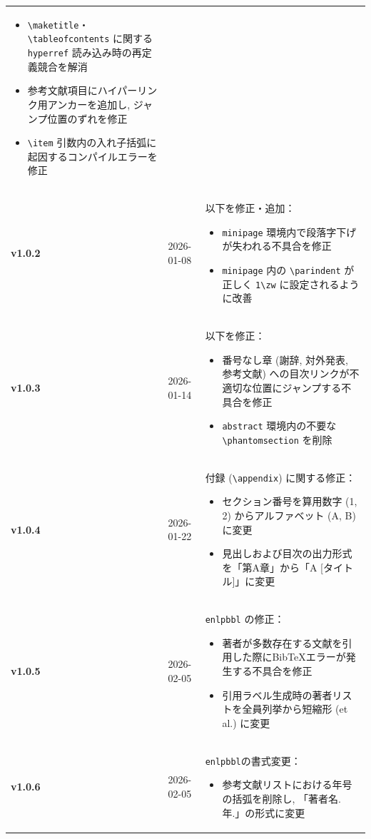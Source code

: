 \documentclass{ltjsarticle}
\newcommand{\pkg}[1]{\texttt{#1}}
\newcommand{\cs}[1]{\texttt{\textbackslash#1}}
\begin{document}
\begin{longtable}{llp{11cm}}
\begin{itemize}[nosep]
        \item \cs{maketitle}・\cs{tableofcontents} に関する \pkg{hyperref} 読み込み時の再定義競合を解消
        \item 参考文献項目にハイパーリンク用アンカーを追加し, ジャンプ位置のずれを修正
        \item \cs{item} 引数内の入れ子括弧に起因するコンパイルエラーを修正
    \end{itemize}\\
    \textbf{v1.0.2}&2026-01-08&以下を修正・追加：
    \begin{itemize}[nosep]
        \item \texttt{minipage} 環境内で段落字下げが失われる不具合を修正
        \item \texttt{minipage} 内の \cs{parindent} が正しく \texttt{1\textbackslash zw} に設定されるように改善
    \end{itemize}\\
    \textbf{v1.0.3}&2026-01-14&以下を修正：
    \begin{itemize}[nosep]
        \item 番号なし章 (謝辞, 対外発表, 参考文献) への目次リンクが不適切な位置にジャンプする不具合を修正
        \item \texttt{abstract} 環境内の不要な \cs{phantomsection} を削除
    \end{itemize}\\
    \textbf{v1.0.4}&2026-01-22&付録 (\cs{appendix}) に関する修正：
    \begin{itemize}[nosep]
        \item セクション番号を算用数字 (1, 2) からアルファベット (A, B) に変更
        \item 見出しおよび目次の出力形式を「第A章」から「A [タイトル]」に変更
    \end{itemize}\\
    \textbf{v1.0.5}&2026-02-05&\pkg{enlpbbl} の修正：
    \begin{itemize}[nosep]
        \item 著者が多数存在する文献を引用した際にBibTeXエラーが発生する不具合を修正
        \item 引用ラベル生成時の著者リストを全員列挙から短縮形 (et al.) に変更
    \end{itemize}\\
    \textbf{v1.0.6}&2026-02-05&\pkg{enlpbbl}の書式変更：
    \begin{itemize}[nosep]
        \item 参考文献リストにおける年号の括弧を削除し, 「著者名. 年.」の形式に変更

\end{itemize}
\end{longtable}
\end{document}
